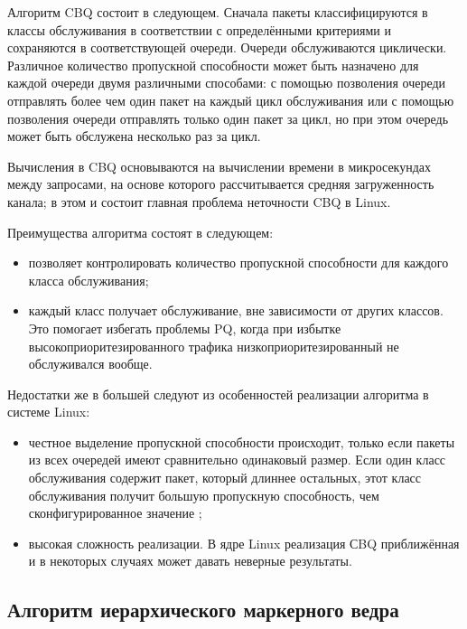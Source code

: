         Алгоритм CBQ состоит в следующем. Сначала пакеты классифицируются в классы
        обслуживания в соответствии с определёнными критериями и сохраняются в
        соответствующей очереди. Очереди обслуживаются циклически. Различное
        количество пропускной способности может быть назначено для каждой очереди
        двумя различными способами: с помощью позволения очереди отправлять более
        чем один пакет на каждый цикл обслуживания или с помощью позволения очереди
        отправлять только один пакет за цикл, но при этом очередь может быть обслужена
        несколько раз за цикл.\cite{packethandling}

		Вычисления в CBQ основываются на вычислении времени в микросекундах между
		запросами, на основе которого рассчитывается средняя загруженность канала;
		в этом и состоит главная проблема неточности CBQ в Linux.\cite{lartc} 

        Преимущества алгоритма состоят в следующем:
        \begin{itemize}
            \item позволяет контролировать количество пропускной способности для каждого
                  класса обслуживания;
            \item каждый класс получает обслуживание, вне зависимости от других классов. Это
                  помогает избегать проблемы PQ, когда при избытке высокоприоритезированного
                  трафика низкоприоритезированный не обслуживался вообще.\cite{packethandling}
        \end{itemize}

        Недостатки же в большей следуют из особенностей реализации алгоритма в системе Linux:
        \begin{itemize}
            \item честное выделение пропускной способности происходит, только если
                  пакеты из всех очередей имеют сравнительно одинаковый размер. Если один класс
                  обслуживания содержит пакет, который длиннее остальных, этот класс обслуживания
                  получит большую пропускную способность, чем сконфигурированное значение \cite{packethandling};

            \item высокая сложность реализации. В ядре Linux реализация СBQ приближённая и
                  в некоторых случаях может давать неверные результаты.\cite{lartc}
        \end{itemize}

    \subsection{Алгоритм иерархического маркерного ведра}

